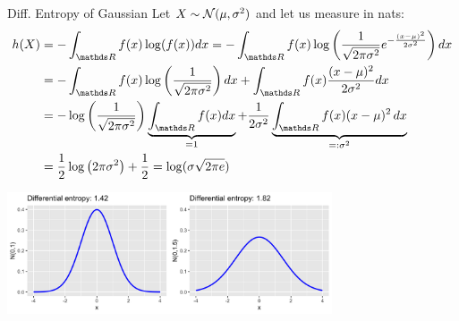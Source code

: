 \documentclass[11pt,compress,t,notes=noshow, xcolor=table]{beamer}
\begin{document}
\begin{vbframe}{Diff. Entropy of Gaussian}
Let $X \sim \mathcal{N}(\mu, \sigma^2)$ and let us measure in nats:
\vspace{-0.2cm}
{\small
  \begin{equation*}
    \begin{aligned} 
     h(X) &= - \int_{\R} f(x) \log(f(x)) dx =  - \int_{\R} f(x) \log\left(\frac{1}{\sqrt{2 \pi \sigma^{2}}} e^{-\frac{(x-\mu)^{2}}{2 \sigma^{2}}} \right) dx \\
          &= - \int_{\R} f(x) \log\left(\frac{1}{\sqrt{2 \pi \sigma^{2}}}\right) dx + \int_{\R} f(x) \frac{(x-\mu)^{2}}{2 \sigma^{2}} dx \\
          &= - \log \left(\frac{1}{\sqrt{2 \pi \sigma^{2}}}\right) \underbrace{\int_{\R} f(x) dx}_{= 1} + \frac{1}{2\sigma^2} \underbrace{\int_{\R} f(x) (x-\mu)^{2}\,dx}_{=: \sigma^2} \\
          &= \frac{1}{2} \log \left(2 \pi \sigma^{2}\right) + \frac{1}{2} =  \log(\sigma \sqrt{2\pi e})
    \end{aligned}
  \end{equation*}
  } \vspace{-0.5cm}
\begin{center}
    \includegraphics[width = 0.72\textwidth]{figure/normal_entropy.png}
\end{center}
\end{vbframe}
\end{document}
